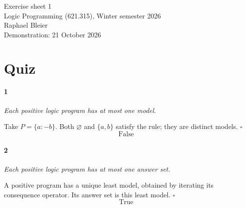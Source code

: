\documentclass[a4paper,11pt]{article}
\newif\ifexplain
\newcommand{\explain}[1]{\ifexplain\begin{erklbox}#1\end{erklbox}\fi}
\newcommand{\angabe}[1]{\textit{#1}\par}
\newcommand{\at}[1]{\texttt{#1}}
\begin{document}
\begin{center}{\Large Exercise sheet 1}\\Logic Programming (621.315), Winter semester 2026\\Raphael Bleier\\Demonstration: 21 October 2026\end{center}
\explain{Ein Atom ist hier eine einzelne Aussage, etwa $\at{bird(tweety)}$. Ein Modell erfüllt alle Regeln, muss aber nicht die kleinste begründbare Menge sein. Ein Answer Set ist die kleinste abgeschlossene Menge seines eigenen Redukts. Default-Negation \texttt{not a} prüft, ob $a$ im Kandidaten fehlt; sie ist keine zusätzliche Aussage $\neg a$. Wir verwenden die Begriffe und die Notation $\operatorname{Cn}(P)$ aus den Kursnotizen zu positiven und normalen Programmen. Ein Punkt beendet jede Regel. Eine Regel wie \texttt{kopf :- bedingung1, bedingung2.} leitet den Kopf ab, wenn beide Bedingungen gelten. Das Komma bedeutet UND. Fakten wie \texttt{a.} haben keinen Regelkörper. Großgeschriebene Namen wie \texttt{X} sind Variablen. Clingo setzt sie beim Grounding mit passenden Fakten ein; eine Regel kann so mehrere ähnliche Fälle abdecken. Die Programme liegen zusätzlich als ausführbare \texttt{.lp}-Dateien im Unterordner \texttt{clingo/}. Mit \texttt{-n 0} lässt Clingo alle Answer Sets ausgeben.}
\section*{Quiz}
\paragraph{1}\angabe{Each positive logic program has at most one model.}
Take $P=\{a\mathbin{:-}b\}$. Both $\varnothing$ and $\{a,b\}$ satisfy the rule; they are distinct models. $\square$
\[
\boxed{\text{False}}
\]
\explain{Hier unterscheiden wir gewöhnliche Modelle von Answer Sets. Für ein Answer Set dürfen keine Atome ohne eine Herleitung aus dem Redukt übrig bleiben. Die Aussage über normale Programme nutzt ausdrücklich die Kursdefinition mit genau einem Atom im Regelkopf.}
\paragraph{2}\angabe{Each positive logic program has at most one answer set.}
A positive program has a unique least model, obtained by iterating its consequence operator. Its answer set is this least model. $\square$
\[
\boxed{\text{True}}
\]
\explain{Hier unterscheiden wir gewöhnliche Modelle von Answer Sets. Für ein Answer Set dürfen keine Atome ohne eine Herleitung aus dem Redukt übrig bleiben. Die Aussage über normale Programme nutzt ausdrücklich die Kursdefinition mit genau einem Atom im Regelkopf.}
\end{document}
